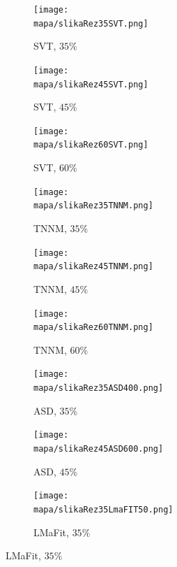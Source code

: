 \begin{figure}[!ht]
    \centering
    \begin{subfigure}{0.325\linewidth}
        \texttt{[image: \\mapa/slikaRez35SVT.png]}
        \caption{SVT, $35\%$}
    \end{subfigure}
    \hfill
    \begin{subfigure}{0.325\linewidth}
        \texttt{[image: \\mapa/slikaRez45SVT.png]}
        \caption{SVT, $45\%$}
    \end{subfigure}
    \hfill
    \begin{subfigure}{0.325\linewidth}
        \texttt{[image: \\mapa/slikaRez60SVT.png]}
        \caption{SVT, $60\%$}
    \end{subfigure}
    \begin{subfigure}{0.325\linewidth}
        \texttt{[image: \\mapa/slikaRez35TNNM.png]}
        \caption{TNNM, $35\%$}
    \end{subfigure}
    \hfill
    \begin{subfigure}{0.325\linewidth}
        \texttt{[image: \\mapa/slikaRez45TNNM.png]}
        \caption{TNNM, $45\%$}
    \end{subfigure}
    \hfill
    \begin{subfigure}{0.325\linewidth}
        \texttt{[image: \\mapa/slikaRez60TNNM.png]}
        \caption{TNNM, $60\%$}
    \end{subfigure}
    \begin{subfigure}{0.325\linewidth}
        \texttt{[image: \\mapa/slikaRez35ASD400.png]}
        \caption{ASD, $35\%$}
    \end{subfigure}
    \hfill
    \begin{subfigure}{0.325\linewidth}
        \texttt{[image: \\mapa/slikaRez45ASD600.png]}
        \caption{ASD, $45\%$}
    \end{subfigure}
    \begin{subfigure}{0.325\linewidth}
        \hfill
    \end{subfigure}
    \begin{subfigure}{0.325\linewidth}
        \texttt{[image: \\mapa/slikaRez35LmaFIT50.png]}
        \caption{LMaFit, $35\%$}

\end{subfigure}
\end{figure}
